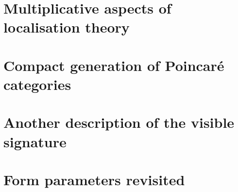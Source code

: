 \documentclass[10pt]{amsart}
\begin{document}
\begin{appendices}
\renewcommand{\appendixtocname}{{\bf Appendices}}
\addappheadtotoc

\section{Multiplicative aspects of localisation theory}
\label{section:appendix-localisations}%


\section{Compact generation of Poincaré categories}
\label{section:presentability}%


\section{Another description of the visible signature}
\label{section:appendix-visible-revisited}%


\section{Form parameters revisited}
\label{section:appendix-form-parameters}%


\end{appendices}


\begin{bibsection}

 \hfill \\



 \hfill \\

\begin{biblist}%


\end{biblist}
\end{bibsection}
\end{document}
